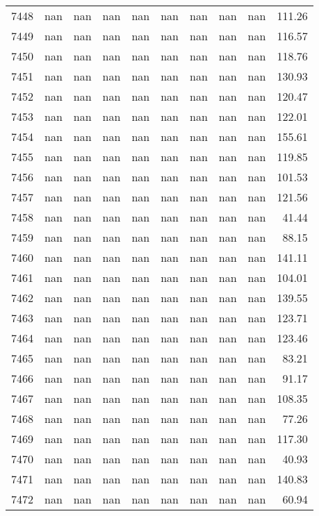 \begin{tabular}{lrrrrrrrrr}
7448 & nan & nan & nan & nan & nan & nan & nan & nan & 111.26 \\
7449 & nan & nan & nan & nan & nan & nan & nan & nan & 116.57 \\
7450 & nan & nan & nan & nan & nan & nan & nan & nan & 118.76 \\
7451 & nan & nan & nan & nan & nan & nan & nan & nan & 130.93 \\
7452 & nan & nan & nan & nan & nan & nan & nan & nan & 120.47 \\
7453 & nan & nan & nan & nan & nan & nan & nan & nan & 122.01 \\
7454 & nan & nan & nan & nan & nan & nan & nan & nan & 155.61 \\
7455 & nan & nan & nan & nan & nan & nan & nan & nan & 119.85 \\
7456 & nan & nan & nan & nan & nan & nan & nan & nan & 101.53 \\
7457 & nan & nan & nan & nan & nan & nan & nan & nan & 121.56 \\
7458 & nan & nan & nan & nan & nan & nan & nan & nan & 41.44 \\
7459 & nan & nan & nan & nan & nan & nan & nan & nan & 88.15 \\
7460 & nan & nan & nan & nan & nan & nan & nan & nan & 141.11 \\
7461 & nan & nan & nan & nan & nan & nan & nan & nan & 104.01 \\
7462 & nan & nan & nan & nan & nan & nan & nan & nan & 139.55 \\
7463 & nan & nan & nan & nan & nan & nan & nan & nan & 123.71 \\
7464 & nan & nan & nan & nan & nan & nan & nan & nan & 123.46 \\
7465 & nan & nan & nan & nan & nan & nan & nan & nan & 83.21 \\
7466 & nan & nan & nan & nan & nan & nan & nan & nan & 91.17 \\
7467 & nan & nan & nan & nan & nan & nan & nan & nan & 108.35 \\
7468 & nan & nan & nan & nan & nan & nan & nan & nan & 77.26 \\
7469 & nan & nan & nan & nan & nan & nan & nan & nan & 117.30 \\
7470 & nan & nan & nan & nan & nan & nan & nan & nan & 40.93 \\
7471 & nan & nan & nan & nan & nan & nan & nan & nan & 140.83 \\
7472 & nan & nan & nan & nan & nan & nan & nan & nan & 60.94 \\

\end{tabular}
